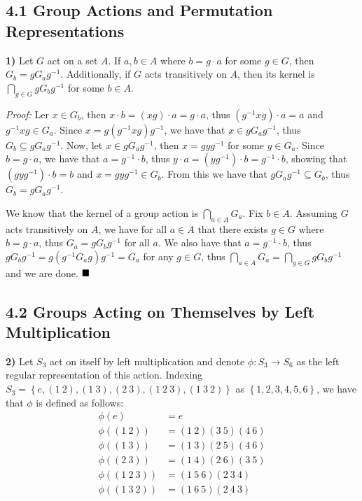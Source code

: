 \documentclass[12pt]{article}
\newcommand{\braceb}[1]{\left\{#1\right\}}
\newcommand{\proof}{\textit{Proof: }}
\newcommand{\done}{\ensuremath{\strut\hfill\blacksquare}}
\begin{document}
\pagestyle{fancy}

\setlength{\parindent}{0in}
\setlength{\parskip}{0.09in}

\subsection*{4.1 Group Actions and Permutation Representations}

\textbf{1)}
Let \( G \) act on a set \( A \).
If \( a, b \in A \) where \( b = g \cdot a \) for some \( g \in G \), then
\( G_b = gG_ag^{-1} \).
Additionally, if \( G \) acts transitively on \( A \), then its kernel is
\( \bigcap_{g \in G} gG_bg^{-1} \) for some \( b \in A \).

\proof
Ler \( x \in G_b \), then \( x \cdot b = (xg) \cdot a = g \cdot a \), thus
\( (g^{-1}xg) \cdot a = a \) and \( g^{-1}xg \in G_a \).
Since \( x = g(g^{-1}xg)g^{-1} \), we have that \( x \in gG_ag^{-1} \), thus
\( G_b \subseteq gG_ag^{-1} \).
Now, let \( x \in gG_ag^{-1} \), then \( x = gyg^{-1} \) for some
\( y \in G_a \).
Since \( b = g \cdot a \), we have that \( a = g^{-1} \cdot b \), thus
\( y \cdot a = (yg^{-1}) \cdot b = g^{-1} \cdot b \), showing that
\( (gyg^{-1}) \cdot b = b \) and \( x = gyg^{-1} \in G_b \).
From this we have that \( gG_ag^{-1} \subseteq G_b \), thus
\( G_b = gG_ag^{-1} \).

We know that the kernel of a group action is \( \bigcap_{a \in A} G_a \).
Fix \( b \in A \).
Assuming \( G \) acts transitively on \( A \), we have for all \( a \in A \)
that there exists \( g \in G \) where \( b = g \cdot a \),
thus \( G_a = gG_bg^{-1} \) for all \( a \).
We also have that \( a = g^{-1} \cdot b \), thus
\( gG_bg^{-1} = g(g^{-1}G_ag)g^{-1} = G_a \) for any \( g \in G \), thus
\( \bigcap_{a \in A} G_a = \bigcap_{g \in G} gG_bg^{-1} \) and we are done.
\done

\subsection*{4.2 Groups Acting on Themselves by Left Multiplication}

\textbf{2)}
Let \( S_3 \) act on itself by left multiplication and denote
\( \phi : S_3 \to S_6 \) as the left regular representation of this action.
Indexing \( S_3 = \braceb{e, (1\ 2), (1\ 3), (2\ 3), (1\ 2\ 3), (1\ 3\ 2)} \)
as \( \braceb{1, 2, 3, 4, 5, 6} \), we have that \( \phi \) is defined as
follows:
\begin{align*}
	\phi(e)         & = e                  \\
	\phi((1\ 2))    & = (1\ 2)(3\ 5)(4\ 6) \\
	\phi((1\ 3))    & = (1\ 3)(2\ 5)(4\ 6) \\
	\phi((2\ 3))    & = (1\ 4)(2\ 6)(3\ 5) \\
	\phi((1\ 2\ 3)) & = (1\ 5\ 6)(2\ 3\ 4) \\
	\phi((1\ 3\ 2)) & = (1\ 6\ 5)(2\ 4\ 3)
\end{align*}
\end{document}
